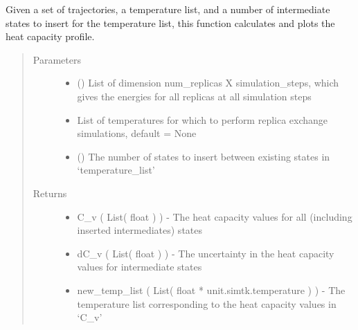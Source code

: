 \documentclass[letterpaper,12pt,english,openany,oneside]{sphinxmanual}
\begin{document}
\begin{fulllineitems}
\label{\detokenize{thermo:thermo.calc.get_heat_capacity}}
Given a set of trajectories, a temperature list, and a number of intermediate states to insert for the temperature list, this function calculates and plots the heat capacity profile.
\begin{quote}\begin{description}
\item[{Parameters}] \leavevmode\begin{itemize}
\item {} 
 (\sphinxstyleliteralemphasis{\sphinxupquote{( }}\sphinxstyleliteralemphasis{\sphinxupquote{( }}\sphinxstyleliteralemphasis{\sphinxupquote{ ) }}\sphinxstyleliteralemphasis{\sphinxupquote{ )}}) \textendash{} List of dimension num\_replicas X simulation\_steps, which gives the energies for all replicas at all simulation steps

\item {} 
 \textendash{} List of temperatures for which to perform replica exchange simulations, default = None

\item {} 
 () \textendash{} The number of states to insert between existing states in ‘temperature\_list’

\end{itemize}

\item[{Returns}] \leavevmode
\begin{itemize}
\item {} 
C\_v ( List( float ) ) - The heat capacity values for all (including inserted intermediates) states

\item {} 
dC\_v ( List( float ) ) - The uncertainty in the heat capacity values for intermediate states

\item {} 
new\_temp\_list ( List( float * unit.simtk.temperature ) ) - The temperature list corresponding to the heat capacity values in ‘C\_v’

\end{itemize}


\end{description}\end{quote}

\end{fulllineitems}
\end{document}

